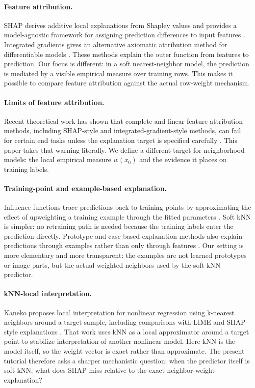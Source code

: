 \documentclass[11pt]{article}
\newcommand{\1}{\mathbf{1}}
\begin{document}
\paragraph{Feature attribution.} SHAP derives additive local explanations from Shapley values and provides a model-agnostic framework for assigning prediction differences to input features \citep{shapley1953value,lundberg2017unified}. Integrated gradients gives an alternative axiomatic attribution method for differentiable models \citep{sundararajan2017axiomatic}. These methods explain the outer function from features to prediction. Our focus is different: in a soft nearest-neighbor model, the prediction is mediated by a visible empirical measure over training rows. This makes it possible to compare feature attribution against the actual row-weight mechanism.

\paragraph{Limits of feature attribution.} Recent theoretical work has shown that complete and linear feature-attribution methods, including SHAP-style and integrated-gradient-style methods, can fail for certain end tasks unless the explanation target is specified carefully \citep{bilodeau2024impossibility}. This paper takes that warning literally. We define a different target for neighborhood models: the local empirical measure $w(x_0)$ and the evidence it places on training labels.

\paragraph{Training-point and example-based explanation.} Influence functions trace predictions back to training points by approximating the effect of upweighting a training example through the fitted parameters \citep{koh2017understanding}. Soft kNN is simpler: no retraining path is needed because the training labels enter the prediction directly. Prototype and case-based explanation methods also explain predictions through examples rather than only through features \citep{li2018deep,chen2019looks}. Our setting is more elementary and more transparent: the examples are not learned prototypes or image parts, but the actual weighted neighbors used by the soft-kNN predictor.

\paragraph{kNN-local interpretation.} Kaneko proposes local interpretation for nonlinear regression using k-nearest neighbors around a target sample, including comparisons with LIME and SHAP-style explanations \citep{kaneko2023local}. That work uses kNN as a local approximator around a target point to stabilize interpretation of another nonlinear model. Here kNN is the model itself, so the weight vector is exact rather than approximate. The present tutorial therefore asks a sharper mechanistic question: when the predictor itself is soft kNN, what does SHAP miss relative to the exact neighbor-weight explanation?
\end{document}
